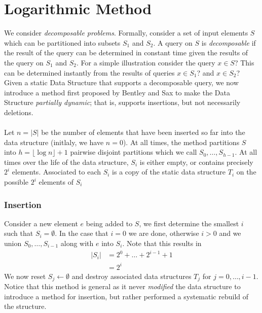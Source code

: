 \documentclass{article}
\begin{document}
\hspace{95mm}

\section*{Logarithmic Method}

We consider \textit{decomposable problems}. Formally, consider a set of input elements $S$ which can be partitioned into subsets $S_1$ and $S_2$. A query on $S$ is \textit{decomposable} if the result of the query can be determined in constant time given the results of the query on $S_1$ and $S_2$. For a simple illustration consider the query $x\in S$? This can be determined instantly from the results of queries $x\in S_1$? and $x\in  S_2$? Given a static Data Structure that supports a decomposable query, we now introduce a method first proposed by Bentley and Sax \cite{BENTLEY1980301} to make the Data Structure \textit{partially dynamic}; that is, supports insertions, but not necessarily deletions.  \\
\\
Let $n=|S|$ be the number of elements that have been inserted so far into the data structure (initlaly, we have $n=0$). At all times, the method partitions $S$ into $h = \lfloor\log n \rfloor + 1$ pairwise disjoint partitions which we call $S_0, \dots, S_{h-1}$. At all times over the life of the data structure, $S_i$ is either empty, or contains precisely $2^i$ elements. Associated to each $S_i$ is a copy of the static data structure $T_i$ on the possible $2^i$ elements of $S_i$

\subsubsection*{Insertion}

Consider a new element $e$ being added to $S$, we first determine the smallest $i$ such that $S_i = \emptyset$. In the case that $i=0$ we are done, otherwise $i>0$ and we union  $S_0, \dots, S_{i-1}$ along with $e$ into $S_i$. Note that this results in 
\begin{align*}
    |S_i| &= 2^0 + \dots + 2^{i-1} +1 \\
          &= 2^i
\end{align*}
We now reset $S_j \leftarrow\emptyset$  and destroy associated data structures $T_j$ for $j = 0, \dots, i-1$. Notice that this method is general as it never \textit{modified} the data structure to introduce a method for insertion, but rather performed a systematic rebuild of the structure. 
\end{document}
